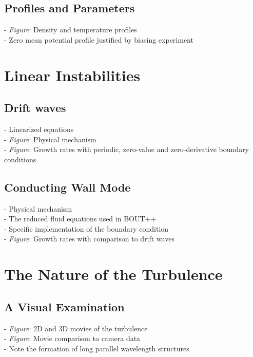 \documentclass[12pt]{article}
\begin{document}
\subsection{Profiles and Parameters}

- \emph{Figure}: Density and temperature profiles \\
- Zero mean potential profile justified by biasing experiment \\

\section{Linear Instabilities}

\subsection{Drift waves}

- Linearized equations \\
- \emph{Figure}: Physical mechanism \\
- \emph{Figure}: Growth rates with periodic, zero-value and zero-derivative boundary conditions \\

\subsection{Conducting Wall Mode}

- Physical mechanism \\
- The reduced fluid equations used in BOUT++ \\
- Specific implementation of the boundary condition \\
- \emph{Figure}: Growth rates with comparison to drift waves \\


\section{The Nature of the Turbulence}

\subsection{A Visual Examination}

- \emph{Figure}: 2D and 3D movies of the turbulence \\
- \emph{Figure}: Movie comparison to camera data \\
- Note the formation of long parallel wavelength structures \\
\end{document}
